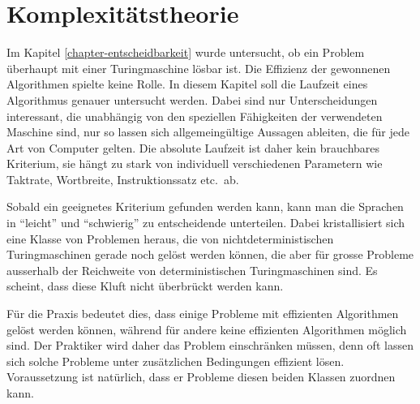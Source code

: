 %
%
%
\chapter{Komplexitätstheorie\label{chapter-komplexitaet}}
\rhead{}
Im Kapitel \ref{chapter-entscheidbarkeit} wurde untersucht, ob ein
Problem überhaupt mit einer Turingmaschine lösbar ist.
Die Effizienz der gewonnenen Algorithmen spielte keine Rolle.
In diesem Kapitel soll die Laufzeit eines Algorithmus genauer
untersucht werden.
Dabei sind nur Unterscheidungen interessant,
die unabhängig von den speziellen Fähigkeiten der verwendeten
Maschine sind, nur so lassen sich allgemeingültige Aussagen
ableiten, die für jede Art von Computer gelten.
Die absolute Laufzeit
ist daher kein brauchbares Kriterium, sie hängt zu stark
von individuell verschiedenen Parametern wie Taktrate, Wortbreite,
Instruktionssatz etc.~ab.

Sobald ein geeignetes Kriterium gefunden werden kann, kann man
die Sprachen in ``leicht'' und ``schwierig'' zu entscheidende 
unterteilen.
Dabei kristallisiert sich eine Klasse von
Problemen heraus, die von nichtdeterministischen Turingmaschinen
gerade noch gelöst werden können, die aber für grosse
Probleme ausserhalb der Reichweite von deterministischen Turingmaschinen
sind.
Es scheint, dass diese Kluft nicht überbrückt werden kann.

Für die Praxis bedeutet dies, dass einige Probleme mit effizienten
Algorithmen gelöst werden können, während für andere 
keine effizienten Algorithmen möglich sind.
Der Praktiker wird daher
das Problem einschränken müssen, denn oft lassen sich solche
Probleme unter zusätzlichen Bedingungen effizient lösen.
Voraussetzung ist natürlich, dass er Probleme diesen beiden
Klassen zuordnen kann.












